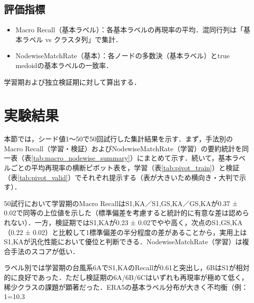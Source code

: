 \documentclass{jarticle}
\theoremstyle{definition}
\begin{document}
\subsection{評価指標}
\begin{itemize}
\item Macro Recall（基本ラベル）：各基本ラベルの再現率の平均．混同行列は「基本ラベル vs クラスタ列」で集計．
\item NodewiseMatchRate（基本）：各ノードの多数決（基本ラベル）とtrue medoidの基本ラベルの一致率．
\end{itemize}
学習期および独立検証期に対して算出する．

\section{実験結果}
本節では，シード値1〜50で50回試行した集計結果を示す．まず，手法別のMacro Recall（学習・検証）およびNodewiseMatchRate（学習）の要約統計を同一表（表\ref{tab:macro_nodewise_summary}）にまとめて示す．続いて，基本ラベルごとの平均再現率の横断ピボット表を，学習（表\ref{tab:pivot_train}）と検証（表\ref{tab:pivot_valid}）でそれぞれ提示する（表が大きいため横向き・大判で示す）．

50試行において学習期のMacro RecallはS1,KA／S1,GS,KA／GS,KAが0.37 ± 0.02で同等の上位値を示した（標準偏差を考慮すると統計的に有意な差は認められない）．一方，検証期ではS1,KAが0.23 ± 0.02でやや高く，次点のS1,GS,KA（0.22 ± 0.02）と比較して1標準偏差の半分程度の差があることから，実用上はS1,KAが汎化性能において優位と判断できる．NodewiseMatchRate（学習）は複合手法のスコアが低い．

ラベル別では学習期の台風系6AでS1,KAのRecallが0.61と突出し，6BはS1が相対的に良好であった．ただし検証期の6A/6B/6Cはいずれも再現率が極めて低く，稀少クラスの課題が顕著だった．ERA5の基本ラベル分布が大きく不均衡（例：1=10.3%
\end{document}
